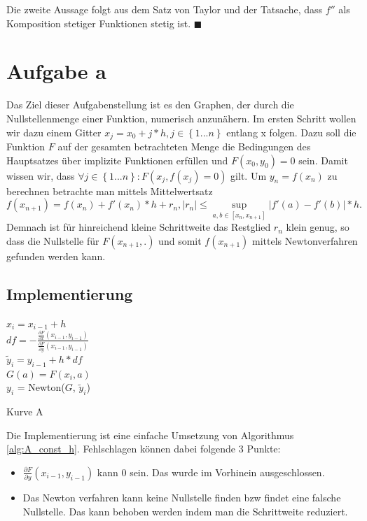 \documentclass[a4paper,11pt,bibliography=totoc,listof=totoc,headinclude=true,cleardoublepage=empty,oneside]{scrartcl}
\newcommand{\diff}[2]{\frac{\partial #1}{\partial #2}}
\newcounter{satz}
\begin{document}
Die zweite Aussage folgt aus dem Satz von Taylor und der Tatsache, dass $f''$ als Komposition stetiger Funktionen stetig ist. \hfill $\blacksquare$

\section{Aufgabe a}
Das Ziel dieser Aufgabenstellung ist es den Graphen, der durch die Nullstellenmenge einer Funktion, numerisch anzunähern. Im ersten Schritt wollen wir dazu einem Gitter $x_j = x_0 + j*h, j \in \left\lbrace1...n\right\rbrace $ entlang x folgen. 
Dazu soll die Funktion $F$ auf der gesamten betrachteten Menge die Bedingungen des Hauptsatzes über implizite Funktionen erfüllen und $F(x_0,y_0)=0$ sein. Damit wissen wir, dass $\forall j \in \left\lbrace1...n\right\rbrace: F(x_j,f(x_j)=0)$ gilt. Um $y_n = f(x_n)$ zu berechnen betrachte man mittels Mittelwertsatz
\[
f(x_{n+1})=f(x_n)+f'(x_n)*h+r_n, \left|r_n\right|\leq \sup\limits_{a,b \in \left[x_n,x_{n+1}\right]}\left|{f'(a)-f'(b)}\right|*h.
\]
Demnach ist für hinreichend kleine Schrittweite das Restglied $r_n$ klein genug, so dass die Nullstelle für $F(x_{n+1},.)$ und somit $f(x_{n+1})$ mittels Newtonverfahren gefunden werden kann.
\subsection{Implementierung}
\begin{algorithm}
	\label{alg:A_const_h}
	{
		$x_i = x_{i-1}+h$\\
		$df = -\frac{\diff{F}{x}(x_{i-1},y_{i-1})}{\diff{F}{y}(x_{i-1},y_{i-1})}$\\
		$\tilde y_i = y_{i-1}+h*df$\\
		$G(a) = F(x_i,a)$\\
		$y_i$ = Newton($G$, $\tilde y_i$)
	}
	\caption{Kurve A}
\end{algorithm}
Die Implementierung ist eine einfache Umsetzung von Algorithmus \ref{alg:A_const_h}.
Fehlschlagen können dabei folgende 3 Punkte:
\begin{itemize}
	\item $\diff{F}{y}(x_{i-1},y_{i-1})$ kann 0 sein. Das wurde im Vorhinein ausgeschlossen.
	\item Das Newton verfahren kann keine Nullstelle finden bzw findet eine falsche Nullstelle. Das kann behoben werden indem man die Schrittweite reduziert.
\end{itemize}
\end{document}
